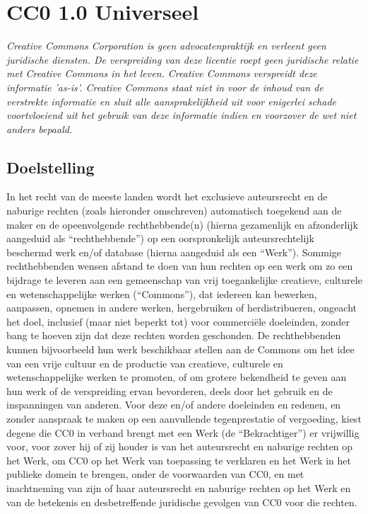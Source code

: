\documentclass[10pt, a4paper]{article}
\begin{document}
\newpage
\appendix
\section{CC0 1.0 Universeel}
\textit{Creative Commons Corporation is geen advocatenpraktijk en verleent geen juridische diensten. De verspreiding van deze licentie roept geen juridische relatie met Creative Commons in het leven. Creative Commons verspreidt deze informatie 'as-is'. Creative Commons staat niet in voor de inhoud van de verstrekte informatie en sluit alle aansprakelijkheid uit voor enigerlei schade voortvloeiend uit het gebruik van deze informatie indien en voorzover de wet niet anders bepaald.}

\subsection*{Doelstelling}
In het recht van de meeste landen wordt het exclusieve auteursrecht en de naburige rechten (zoals hieronder omschreven) automatisch toegekend aan de maker en de opeenvolgende rechthebbende(n) (hierna gezamenlijk en afzonderlijk aangeduid als ``rechthebbende'') op een oorspronkelijk auteursrechtelijk beschermd werk en/of database (hierna aangeduid als een ``Werk'').
Sommige rechthebbenden wensen afstand te doen van hun rechten op een werk om zo een bijdrage te leveren aan een gemeenschap van vrij toegankelijke creatieve, culturele en wetenschappelijke werken (``Commons''), dat iedereen kan bewerken, aanpassen, opnemen in andere werken, hergebruiken of herdistribueren, ongeacht het doel, inclusief (maar niet beperkt tot) voor commerciële doeleinden, zonder bang te hoeven zijn dat deze rechten worden geschonden. De rechthebbenden kunnen bijvoorbeeld hun werk beschikbaar stellen aan de Commons om het idee van een vrije cultuur en de productie van creatieve, culturele en wetenschappelijke werken te promoten, of om grotere bekendheid te geven aan hun werk of de verspreiding ervan bevorderen, deels door het gebruik en de inspanningen van anderen.
Voor deze en/of andere doeleinden en redenen, en zonder aanspraak te maken op een aanvullende tegenprestatie of vergoeding, kiest degene die CC0 in verband brengt met een Werk (de ``Bekrachtiger'') er vrijwillig voor, voor zover hij of zij houder is van het auteursrecht en naburige rechten op het Werk, om CC0 op het Werk van toepassing te verklaren en het Werk in het publieke domein te brengen, onder de voorwaarden van CC0, en met inachtneming van zijn of haar auteursrecht en naburige rechten op het Werk en van de betekenis en desbetreffende juridische gevolgen van CC0 voor die rechten.
\end{document}

